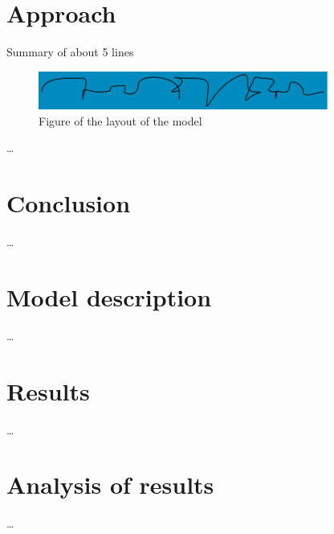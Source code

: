 \section*{Approach}
Summary of about 5 lines
\begin{figure}[H]
    \centering
    \includegraphics*[width=0.85\textwidth]{figures/gekras.png}
    \caption{Figure of the layout of the model}
\end{figure}
\ldots

\section*{Conclusion} 
\ldots

\section*{Model description}
\ldots

\section*{Results}
\ldots

\section*{Analysis of results}
\ldots

\printrefsegment
